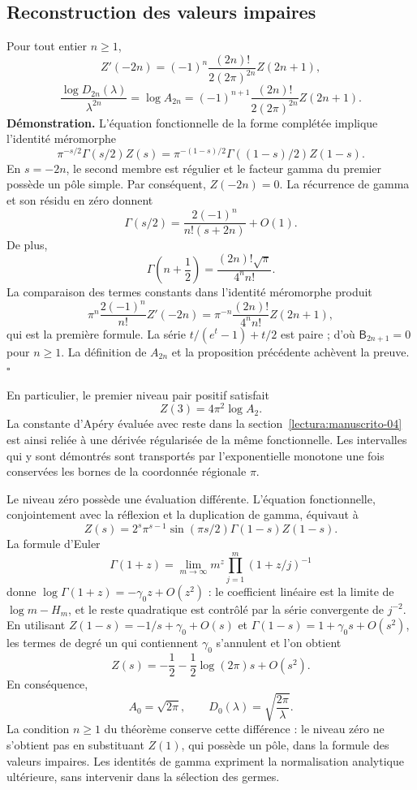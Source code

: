 \subsection{Reconstruction des valeurs impaires}
Pour tout entier $n\geq1$,
\[
 Z'(-2n)=(-1)^n\frac{(2n)!}{2(2\pi)^{2n}}Z(2n+1),
\]
\[
 \frac{\log D_{2n}(\lambda)}{\lambda^{2n}}
 =\log A_{2n}
 =(-1)^{n+1}\frac{(2n)!}{2(2\pi)^{2n}}Z(2n+1).
\]
\textbf{Démonstration.} L'équation fonctionnelle de la forme complétée
implique l'identité méromorphe
\[
 \pi^{-s/2}\Gamma(s/2)Z(s)
 =\pi^{-(1-s)/2}\Gamma((1-s)/2)Z(1-s).
\]
En $s=-2n$, le second membre est régulier et le facteur gamma du
premier possède un pôle simple. Par conséquent, $Z(-2n)=0$. La récurrence
de gamma et son résidu en zéro donnent
\[
 \Gamma(s/2)=\frac{2(-1)^n}{n!(s+2n)}+O(1).
\]
De plus,
\[
 \Gamma\!\left(n+\frac12\right)
 =\frac{(2n)!\sqrt\pi}{4^nn!}.
\]
La comparaison des termes constants dans l'identité méromorphe produit
\[
 \pi^n\frac{2(-1)^n}{n!}Z'(-2n)
 =\pi^{-n}\frac{(2n)!}{4^nn!}Z(2n+1),
\]
qui est la première formule. La série
$t/(e^t-1)+t/2$ est paire ; d'où $\mathsf B_{2n+1}=0$ pour
$n\geq1$. La définition de $A_{2n}$ et la proposition précédente
achèvent la preuve. \hfill$\square$

En particulier, le premier niveau pair positif satisfait
\[
 Z(3)=4\pi^2\log A_2.
\]
La constante d'Apéry évaluée avec reste dans la section~\ref{lectura:manuscrito-04} est ainsi reliée à une dérivée régularisée de la même fonctionnelle. Les intervalles qui y sont démontrés sont transportés par l'exponentielle monotone une fois conservées les bornes de la coordonnée régionale $\pi$.

Le niveau zéro possède une évaluation différente. L'équation fonctionnelle,
conjointement avec la réflexion et la duplication de gamma, équivaut à
\[
 Z(s)=2^s\pi^{s-1}\sin(\pi s/2)\Gamma(1-s)Z(1-s).
\]
La formule d'Euler
\[
 \Gamma(1+z)=\lim_{m\to\infty}
 m^z\prod_{j=1}^{m}(1+z/j)^{-1}
\]
donne $\log\Gamma(1+z)=-\gamma_0z+O(z^2)$ : le coefficient linéaire est
la limite de $\log m-H_m$, et le reste quadratique est contrôlé
par la série convergente de $j^{-2}$. En utilisant
$Z(1-s)=-1/s+\gamma_0+O(s)$ et
$\Gamma(1-s)=1+\gamma_0s+O(s^2)$, les termes de degré un
qui contiennent $\gamma_0$ s'annulent et l'on obtient
\[
 Z(s)=-\frac12-\frac12\log(2\pi)s+O(s^2).
\]
En conséquence,
\[
 A_0=\sqrt{2\pi},\qquad D_0(\lambda)=\sqrt{\frac{2\pi}{\lambda}}.
\]
La condition $n\geq1$ du théorème conserve cette différence : le niveau
zéro ne s'obtient pas en substituant $Z(1)$, qui possède un pôle, dans la formule
des valeurs impaires. Les identités de gamma expriment la normalisation
analytique ultérieure, sans intervenir dans la sélection des germes.
